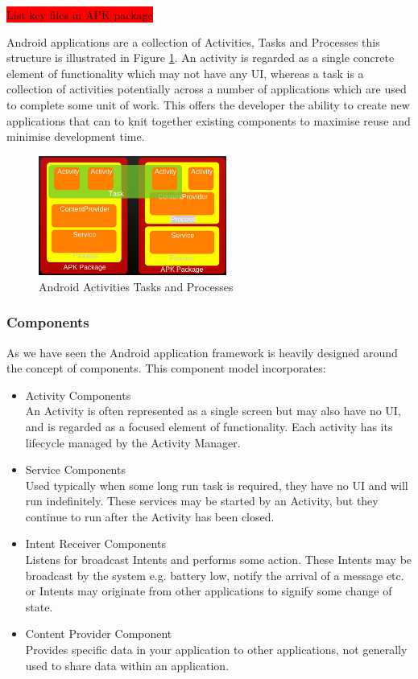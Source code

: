 \colorbox{red}{List key files in APK package}

Android applications are a collection of Activities, Tasks and Processes this structure is illustrated in Figure \ref{activity_activities_tasks_processes}. An activity is regarded as a single concrete element of functionality which may not have any UI, whereas a task is a collection of activities potentially across a number of applications which are used to complete some unit of work. This offers the developer the ability to create new applications that can to knit together existing components to maximise reuse and minimise development time.

\begin{figure}[h!]
\centering
    \includegraphics[width=0.55\textwidth]{research/images/activities_tasks_processes.png}
    \caption{Android Activities Tasks and Processes}%
    \label{activity_activities_tasks_processes}
\end{figure}

\subsubsection{Components}
As we have seen the Android application framework is heavily designed around the concept of components. This component model incorporates:

\begin{itemize}
\item Activity Components\\
An Activity is often represented as a single screen but may also have no UI, and is regarded as a focused element of functionality. Each activity has its lifecycle managed by the Activity Manager.
\item Service Components\\
Used typically when some long run task is required, they have no UI and will run indefinitely. These services may be started by an Activity, but they continue to run after the Activity has been closed.
\item Intent Receiver Components\\ 
Listens for broadcast Intents and performs some action. These Intents may be broadcast by the system e.g. battery low, notify the arrival of a message etc. or Intents may originate from other applications to signify some change of state.
\item Content Provider Component\\
Provides specific data in your application to other applications, not generally used to share data within an application.
\end{itemize}

